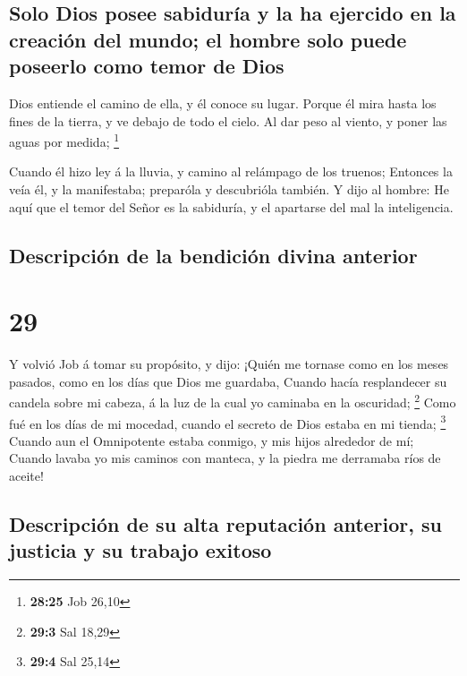 \hypertarget{solo-dios-posee-sabiduruxeda-y-la-ha-ejercido-en-la-creaciuxf3n-del-mundo-el-hombre-solo-puede-poseerlo-como-temor-de-dios}{%
\subsection{Solo Dios posee sabiduría y la ha ejercido en la creación
del mundo; el hombre solo puede poseerlo como temor de
Dios}\label{solo-dios-posee-sabiduruxeda-y-la-ha-ejercido-en-la-creaciuxf3n-del-mundo-el-hombre-solo-puede-poseerlo-como-temor-de-dios}}

 Dios entiende el camino de ella, y él conoce su lugar.
 Porque él mira hasta los fines de la tierra, y ve debajo
de todo el cielo.  Al dar peso al viento, y poner las aguas
por medida; \footnote{\textbf{28:25} Job 26,10}

 Cuando él hizo ley á la lluvia, y camino al relámpago de
los truenos;  Entonces la veía él, y la manifestaba;
preparóla y descubrióla también.  Y dijo al hombre: He aquí
que el temor del Señor es la sabiduría, y el apartarse del mal la
inteligencia.

\hypertarget{descripciuxf3n-de-la-bendiciuxf3n-divina-anterior}{%
\subsection{Descripción de la bendición divina
anterior}\label{descripciuxf3n-de-la-bendiciuxf3n-divina-anterior}}

\hypertarget{section-28}{%
\section{29}\label{section-28}}

 Y volvió Job á tomar su propósito, y dijo: 
¡Quién me tornase como en los meses pasados, como en los días que Dios
me guardaba,  Cuando hacía resplandecer su candela sobre mi
cabeza, á la luz de la cual yo caminaba en la oscuridad; \footnote{\textbf{29:3}
  Sal 18,29}  Como fué en los días de mi mocedad, cuando el
secreto de Dios estaba en mi tienda; \footnote{\textbf{29:4} Sal 25,14}
 Cuando aun el Omnipotente estaba conmigo, y mis hijos
alrededor de mí;  Cuando lavaba yo mis caminos con manteca,
y la piedra me derramaba ríos de aceite!

\hypertarget{descripciuxf3n-de-su-alta-reputaciuxf3n-anterior-su-justicia-y-su-trabajo-exitoso}{%
\subsection{Descripción de su alta reputación anterior, su justicia y su
trabajo
exitoso}\label{descripciuxf3n-de-su-alta-reputaciuxf3n-anterior-su-justicia-y-su-trabajo-exitoso}}

